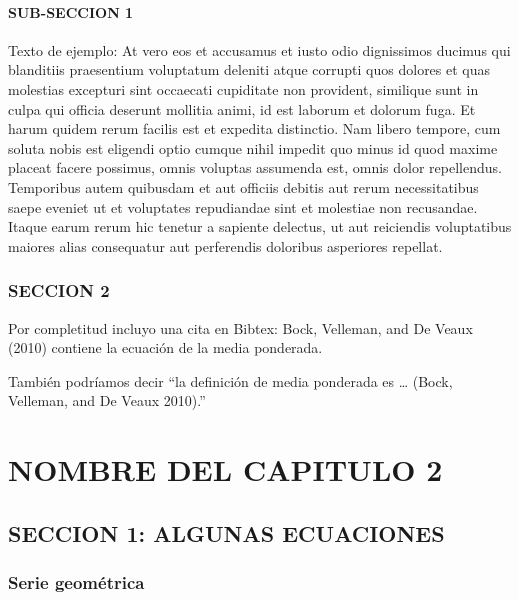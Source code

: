 \documentclass[12pt,reqno,oneside,pdftex]{formato-puc/puctesis} %
\begin{document}
\hypertarget{sub-seccion-1}{%
\subsubsection{SUB-SECCION 1}\label{sub-seccion-1}}

Texto de ejemplo: At vero eos et accusamus et iusto odio dignissimos
ducimus qui blanditiis praesentium voluptatum deleniti atque corrupti
quos dolores et quas molestias excepturi sint occaecati cupiditate non
provident, similique sunt in culpa qui officia deserunt mollitia animi,
id est laborum et dolorum fuga. Et harum quidem rerum facilis est et
expedita distinctio. Nam libero tempore, cum soluta nobis est eligendi
optio cumque nihil impedit quo minus id quod maxime placeat facere
possimus, omnis voluptas assumenda est, omnis dolor repellendus.
Temporibus autem quibusdam et aut officiis debitis aut rerum
necessitatibus saepe eveniet ut et voluptates repudiandae sint et
molestiae non recusandae. Itaque earum rerum hic tenetur a sapiente
delectus, ut aut reiciendis voluptatibus maiores alias consequatur aut
perferendis doloribus asperiores repellat.

\hypertarget{seccion-2}{%
\subsection{SECCION 2}\label{seccion-2}}

Por completitud incluyo una cita en Bibtex: Bock, Velleman, and De Veaux
(2010) contiene la ecuación de la media ponderada.

También podríamos decir ``la definición de media ponderada es \ldots{}
(Bock, Velleman, and De Veaux 2010).''

\chapter{NOMBRE DEL CAPITULO 2}

\hypertarget{seccion-1-algunas-ecuaciones}{%
\section{SECCION 1: ALGUNAS
ECUACIONES}\label{seccion-1-algunas-ecuaciones}}

\hypertarget{serie-geomuxe9trica}{%
\subsection{Serie geométrica}\label{serie-geomuxe9trica}}
\end{document}
